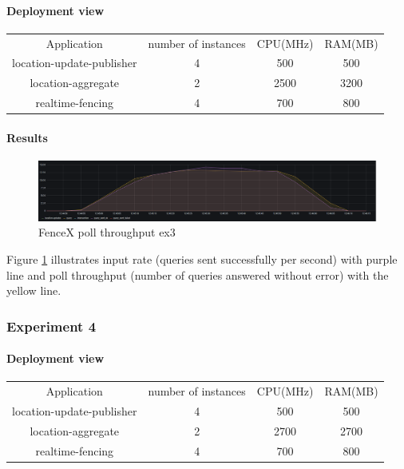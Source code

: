 \documentclass[a4]{report}
\begin{document}
        \paragraph{Deployment view}
        \begin{center}
            \begin{tabular}{ c c c c }
                Application               & number of instances & CPU(MHz) & RAM(MB) \\
                location-update-publisher & 4                   & 500      & 500     \\
                location-aggregate        & 2                   & 2500     & 3200    \\
                realtime-fencing          & 4                   & 700      & 800     \\
            \end{tabular}
        \end{center}

        \paragraph{Results}
        \begin{figure}[ht]
            \caption{FenceX poll throughput ex3}
            \label{fig:ex3}
            \includegraphics[scale=0.4]{images/evaluation/ex3-benchmarking(16,9).png}
        \end{figure}

        Figure \ref{fig:ex3} illustrates input rate (queries sent successfully per second) with purple line and poll
        throughput (number of queries answered without error) with the yellow line.

        \clearpage

        \subsubsection{Experiment 4}

        \paragraph{Deployment view}
        \begin{center}
            \begin{tabular}{ c c c c }
                Application               & number of instances & CPU(MHz) & RAM(MB) \\
                location-update-publisher & 4                   & 500      & 500     \\
                location-aggregate        & 2                   & 2700     & 2700    \\
                realtime-fencing          & 4                   & 700      & 800     \\
            \end{tabular}
        \end{center}
\end{document}
